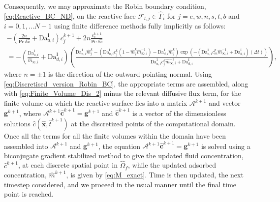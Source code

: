 \documentclass[preprint, 1p, authoryear]{elsarticle}
\begin{document}
Consequently, we may approximate the Robin boundary condition, \eqref{eq:Reactive_BC_ND}, on the reactive face \mbox{$\mathcal{F}_{l,j} \in \hat{\Gamma}_i$} for $j=e,w,n,s,t,b$ and $i = 0, 1, \ldots N-1$ using finite difference methods fully implicitly as follows:
{\small
\begin{multline}
-\left( \frac{2n }{\mathrm{Pe} \: \delta \hat{x}}+\mathrm{Da}^{\textrm{I}}_{a,i} \right) c_j^{k+1} +2 n\frac{ c_c^{k+1} }{ \mathrm{Pe} \: \delta \hat{x}} \\= - \left( \frac{\mathrm{Da}^{\textrm{I}}_{a,i} }{\hat{m}_{\infty,i}}+ \mathrm{Da}^{\textrm{I}}_{d,i} \right) \left( \frac{ \mathrm{Da}^{\textrm{I}}_{a,i} \hat{m}_j^{k}- \left(\mathrm{Da}^{\textrm{I}}_{a,i} c_j^{k}\left( 1 - \hat{m}_j^{k}\hat{m}_{\infty,i}^{-1} \right) - \mathrm{Da}^{\textrm{I}}_{d,i} \hat{m}_j^{k}\right)\exp\left( -\left( \mathrm{Da}^{\textrm{I}}_{a,i} c_m^{p }\hat{m}_{\infty,i}^{-1} +\mathrm{Da}^{\textrm{I}}_{d,i}\right) (\Delta t) \right)}{ \mathrm{Da}^{\textrm{I}}_{a,i} c_j^{k} \hat{m}_{\infty,i}^{-1} + \mathrm{Da}^{\textrm{I}}_{d,i}}\right), \label{eq:Discretised_version_Robin_BC}
\end{multline}}where $n= \pm 1$ is the direction of the outward pointing normal.  
 Using \eqref{eq:Discretised_version_Robin_BC}, the appropriate terms are assembled, along with \eqref{eq:Finite_Volume_Dis_2} minus the relevant diffusive flux term, for the finite volume on which the reactive surface lies into a matrix $\mathcal{A}^{k+1}$ and vector $\mathbf{g}^{k+1}$, where \mbox{$\mathcal{A}^{k+1}\hat{ \mathbf{c}}^{k+1} = \mathbf{g}^{k+1}$} and $\hat{\mathbf{c}}^{k+1}$ is a vector of the dimensionless solutions $\hat{c}(\hat{\mathbf{x}},\hat{t}^{k+1})$ at the discretized points of the computational domain.  Once all the terms for all the finite volumes within the domain have been assembled into $\mathcal{A}^{k+1}$ and $\mathbf{g}^{k+1}$, the equation $\mathcal{A}^{k+1} \hat{\mathbf{c}}^{k+1}= \mathbf{g}^{k+1}$ is solved using a biconjugate gradient stabilized method to give the updated fluid concentration, $\hat{c}^{k+1}$, at each discrete spatial point in $\hat{\Omega}_f$, while the updated adsorbed concentration, $\hat{m}^{k+1}$, is given by \eqref{eq:M_exact}. Time is then updated, the next timestep considered, and we proceed in the usual manner until the final time point is reached. 
\end{document}
